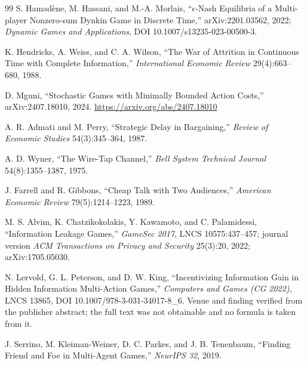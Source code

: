 \begin{thebibliography}{99}
S. Hamad\`ene, M. Hassani, and M.-A. Morlais, ``$\epsilon$-Nash Equilibria of a
Multi-player Nonzero-sum Dynkin Game in Discrete Time,'' arXiv:2201.03562, 2022;
\emph{Dynamic Games and Applications}, DOI 10.1007/s13235-023-00500-3.

K. Hendricks, A. Weiss, and C. A. Wilson, ``The War of Attrition in Continuous
Time with Complete Information,'' \emph{International Economic Review}
29(4):663--680, 1988.

D. Mguni, ``Stochastic Games with Minimally Bounded Action Costs,''
arXiv:2407.18010, 2024. \url{https://arxiv.org/abs/2407.18010}

A. R. Admati and M. Perry, ``Strategic Delay in Bargaining,'' \emph{Review of
Economic Studies} 54(3):345--364, 1987.


A. D. Wyner, ``The Wire-Tap Channel,'' \emph{Bell System Technical Journal}
54(8):1355--1387, 1975.

J. Farrell and R. Gibbons, ``Cheap Talk with Two Audiences,'' \emph{American
Economic Review} 79(5):1214--1223, 1989.

M. S. Alvim, K. Chatzikokolakis, Y. Kawamoto, and C. Palamidessi, ``Information
Leakage Games,'' \emph{GameSec 2017}, LNCS 10575:437--457; journal version
\emph{ACM Transactions on Privacy and Security} 25(3):20, 2022;
arXiv:1705.05030.

N. Lervold, G. L. Peterson, and D. W. King, ``Incentivizing Information Gain in
Hidden Information Multi-Action Games,'' \emph{Computers and Games (CG 2022)},
LNCS 13865, DOI 10.1007/978-3-031-34017-8\_6. Venue and finding verified from the
publisher abstract; the full text was not obtainable and no formula is taken from
it.

J. Serrino, M. Kleiman-Weiner, D. C. Parkes, and J. B. Tenenbaum, ``Finding
Friend and Foe in Multi-Agent Games,'' \emph{NeurIPS 32}, 2019.



\end{thebibliography}
